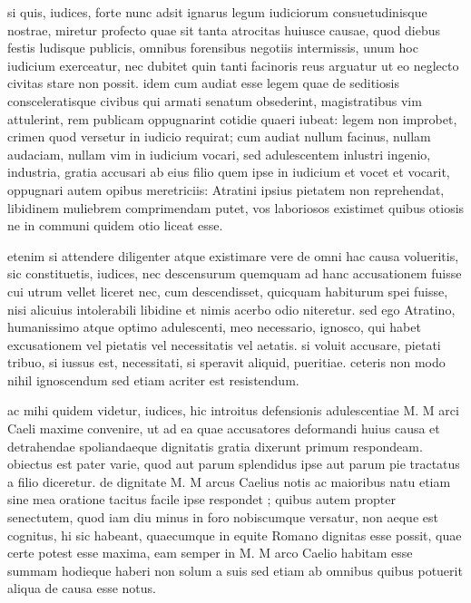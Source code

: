 
 si quis, iudices, forte nunc adsit ignarus legum iudiciorum consuetudinisque nostrae, miretur profecto quae sit tanta atrocitas huiusce causae, quod diebus festis ludisque publicis, omnibus forensibus negotiis intermissis, unum hoc iudicium exerceatur, nec dubitet quin tanti facinoris reus arguatur ut eo neglecto civitas stare non possit. idem cum audiat esse legem quae de seditiosis consceleratisque civibus qui armati senatum obsederint, magistratibus vim attulerint, rem publicam oppugnarint cotidie quaeri iubeat: legem non improbet, crimen quod versetur in iudicio requirat; cum audiat nullum facinus, nullam audaciam, nullam vim in iudicium vocari, sed adulescentem inlustri ingenio, industria, gratia accusari ab eius filio quem ipse in iudicium et vocet et vocarit, oppugnari autem opibus meretriciis: Atratini ipsius pietatem non reprehendat, libidinem muliebrem comprimendam putet, vos laboriosos existimet quibus otiosis ne in communi quidem otio liceat esse.

 etenim si attendere diligenter atque existimare vere de omni hac causa volueritis, sic constituetis, iudices, nec descensurum quemquam ad hanc accusationem fuisse cui utrum vellet liceret nec, cum descendisset, quicquam habiturum spei fuisse, nisi alicuius intolerabili libidine et nimis acerbo odio niteretur. sed ego Atratino, humanissimo atque optimo adulescenti, meo necessario, ignosco, qui habet excusationem vel pietatis vel necessitatis vel aetatis. si voluit accusare, pietati tribuo, si iussus est, necessitati, si speravit aliquid, pueritiae. ceteris non modo nihil ignoscendum sed etiam acriter est resistendum.

 ac mihi quidem videtur, iudices, hic introitus defensionis adulescentiae M. M arci Caeli maxime convenire, ut ad ea quae accusatores deformandi huius causa et detrahendae spoliandaeque dignitatis gratia dixerunt primum respondeam. obiectus est pater varie, quod aut parum splendidus ipse aut parum pie tractatus a filio diceretur. de dignitate M. M arcus Caelius notis ac maioribus natu etiam sine mea oratione tacitus facile ipse respondet ; quibus autem propter senectutem, quod iam diu minus in foro nobiscumque versatur, non aeque est cognitus, hi sic habeant, quaecumque in equite Romano dignitas esse possit, quae certe potest esse maxima, eam semper in M. M arco Caelio habitam esse summam hodieque haberi non solum a suis sed etiam ab omnibus quibus potuerit aliqua de causa esse notus.

